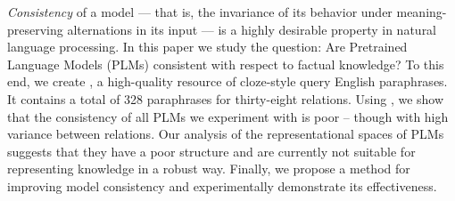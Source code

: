 
\textit{Consistency} of a model --- that is, the invariance
of its behavior under meaning-preserving alternations in its
input --- is a highly desirable property in natural language
processing.  In this paper we study the question: Are
Pretrained Language Models (PLMs) consistent with respect to
factual knowledge?
To this end, we create \resource{}, a
high-quality resource of cloze-style query English
paraphrases. It contains a total of 328 paraphrases for thirty-eight relations. Using \resource{}, we show that the consistency
of all PLMs we experiment with is poor -- though with high
variance between relations.  Our analysis of the
representational spaces of PLMs suggests that they have a
poor structure and are currently not suitable for
representing knowledge in a robust way.  Finally, we propose
a method for improving model consistency and experimentally
demonstrate its effectiveness.

